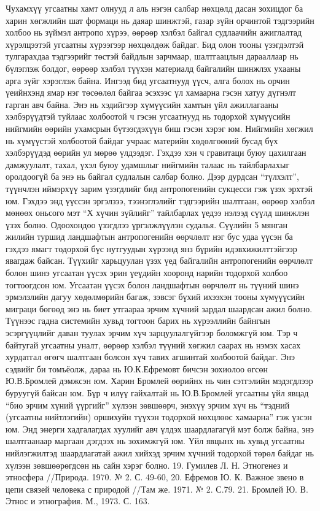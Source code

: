 Чухамхүү угсаатны хамт олнууд л аль нэгэн салбар нөхцөлд дасан зохицдог ба харин хөгжлийн шат формаци нь даяар шинжтэй, газар зүйн орчинтой тэдгээрийн холбоо нь зүймэл антропо хүрээ, өөрөөр хэлбэл байгал судлаачийн ажиглалтад хүрэлцээтэй угсаатны хүрээгээр нөхцөлдөж байдаг. Бид олон тооны үзэгдэлтэй тулгарахдаа тэдгээрийг төстэй байдлын зарчмаар, шалтгаацлын дарааллаар нь бүлэглэж болдог, өөрөөр хэлбэл түүхэн материалд байгалийн шинжлэх ухааны арга зүйг хэрэглэж байна. Ингээд бид угсаатнууд үүсч, алга болох нь орчин үеийнхэнд ямар нэг төсөөлөл байгаа эсэхээс үл хамаарна гэсэн хатуу дүгнэлт гарган авч байна. Энэ нь хэдийгээр хүмүүсийн хамтын үйл ажиллагааны хэлбэрүүдтэй туйлаас холбоотой ч гэсэн угсаатнууд нь тодорхой хүмүүсийн нийгмийн өөрийн ухамсрын бүтээгдэхүүн биш гэсэн хэрэг юм. Нийгмийн хөгжил нь хүмүүстэй холбоотой байдаг учраас материйн хөдөлгөөний бусад бүх хэлбэрүүдэд өөрийн ул мөрөө үлдээдэг. Гэхдээ хэн ч гравитаци буюу цахилгаан дамжуулалт, тахал, үхэл буюу удамшлыг нийгмийн талаас нь тайлбарлахыг оролдоогүй ба энэ нь байгал судлалын салбар болно. Дээр дурдсан “түлхэлт”, түүнчлэн иймэрхүү зарим үзэгдлийг бид антропогенийн сукцесси гэж үзэх эрхтэй юм. Гэхдээ энд үүссэн эргэлзээ, тээнэглэлийг тэдгээрийн шалтгаан, өөрөөр хэлбэл мөнөөх оньсого мэт “Х хүчин зүйлийг” тайлбарлах үедээ нэлээд сүүлд шинжлэн үзэх болно. Одоохондоо үзэгдлээ үргэлжлүүлэн судалья.
Сүүлийн 5 мянган жилийн туршид ландшафтын антропогенийн өөрчлөлт нэг бус удаа үүсэн ба гэхдээ ямагт тодорхой бүс нутгуудын хүрээнд янз бүрийн идэвхижилттэйгээр явагдаж байсан. Түүхийг харьцуулан үзэх үед байгалийн антропогенийн өөрчлөлт болон шинэ угсаатан үүсэх эрин үеүдийн хооронд нарийн тодорхой холбоо тогтоогдсон юм.
Угсаатан үүсэх болон ландшафтын өөрчлөлт нь түүний шинэ эрмэлзлийн дагуу хөдөлмөрийн багаж, зэвсэг бүхий ихээхэн тооны хүмүүүсийн миграци бөгөөд энэ нь биет утгаараа эрчим хүчний зардал шаардсан ажил болно. Түүнээс гадна системийн хувьд тогтоон барих нь хүрээллийн байнгын эсэргүүцлийг даван туулах эрчим хүч зарцуулалгүйгээр боломжгүй юм. Тэр ч байтугай угсаатны уналт, өөрөөр хэлбэл түүний хөгжил саарах нь нэмэх хасах хурдатгал өгөгч шалтгаан болсон хүч тавих агшинтай холбоотой байдаг.
Энэ сэдвийг би томъёолж, дараа нь Ю.К.Ефремовт бичсэн зохиолоо өгсөн Ю.В.Бромлей дэмжсэн юм. Харин Бромлей өөрийнх нь чин сэтгэлийн мэдэгдлээр буруугүй байсан юм. Бүр ч илүү гайхалтай нь Ю.В.Бромлей угсаатны үйл явцад “био эрчим хүний үүргийг” хүлээн зөвшөөрч, энэхүү эрчим хүч нь “тэдний (угсаатны нийтлэгийн) оршихуйн түүхэн тодорхой нөхцлөөс хамаарна” гэж үзсэн юм. Энд энерги хадгалагдах хуулийг авч үлдэх шаардлагагүй мэт болж байна, энэ шалтгаанаар маргаан дэгдээх нь зохимжгүй юм. Үйл явцынх нь хувьд угсаатны нийлэгжилтэд шаардлагатай ажил хийхэд эрчим хүчний тодорхой төрөл байдаг нь хүлээн зөвшөөрөгдсөн нь сайн хэрэг болно. 19. Гумилев Л. Н. Этногенез и этносфера //Природа. 1970. № 2. С. 49-60, 20. Ефремов Ю. К. Важное звено в цепи связей человека с природой //Там же. 1971. № 2. С.79. 21. Бромлей Ю. В. Этнос и этнография. М., 1973. С. 163.
